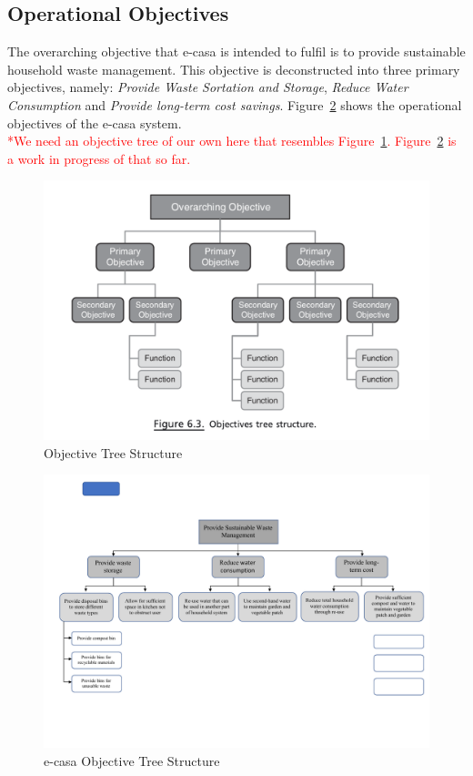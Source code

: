 \documentclass[a4paper,11pt,fleqn]{report}
\begin{document}
\subsection{Operational Objectives}
The overarching objective that \ac{e-casa} is intended to fulfil is to provide sustainable household waste management. This objective is deconstructed into three primary objectives, namely: \textit{Provide Waste Sortation and Storage}, \textit{Reduce Water Consumption} and \textit{Provide long-term cost savings}. Figure~\ref{fig: ecasaOT} shows the operational objectives of the \ac{e-casa} system.\\

\textcolor{red}{*We need an objective tree of our own here that resembles Figure~\ref{fig: ObjectiveTreeStructure}. Figure~\ref{fig: ecasaOT} is a work in progress of that so far.}

\begin{figure}[h!]
\begin{center}
\includegraphics[scale = 0.6]{Objective_Tree_Structure.png}
\caption{Objective Tree Structure}
\label{fig: ObjectiveTreeStructure}
\end{center}
\end{figure}

\begin{figure}[h!]
\begin{center}
\includegraphics[scale = 0.55]{Objective_Tree_ecasa.pdf}
\caption{e-casa Objective Tree Structure}
\label{fig: ecasaOT}
\end{center}
\end{figure}
\end{document}

